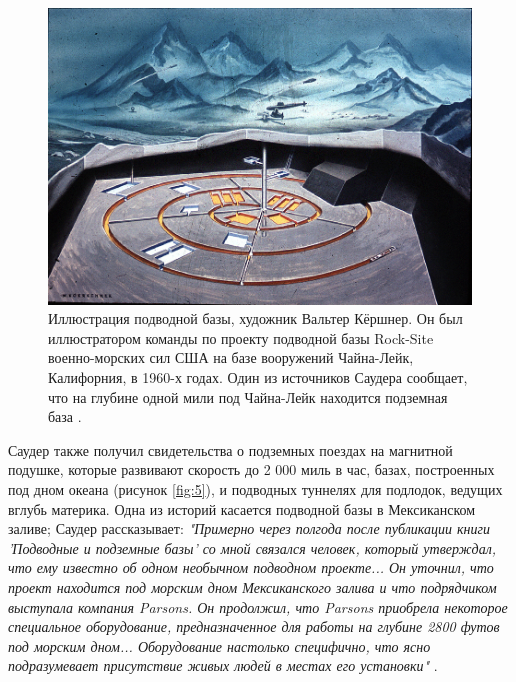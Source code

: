 \documentclass[10pt,twocolumn,letterpaper]{article}
\begin{document}
\begin{figure}[t]
\begin{center}
   \includegraphics[width=1\linewidth]{undersea.jpg}
\end{center}
   \caption{Иллюстрация подводной базы, художник Вальтер Кёршнер. Он был иллюстратором команды по проекту подводной базы Rock-Site военно-морских сил США на базе вооружений Чайна-Лейк, Калифорния, в 1960-х годах. Один из источников Саудера сообщает, что на глубине одной мили под Чайна-Лейк находится подземная база \cite{22,23}.}
\label{fig:5}
\label{fig:onecol}
\end{figure}

Саудер также получил свидетельства о подземных поездах на магнитной подушке, которые развивают скорость до 2 000 миль в час, базах, построенных под дном океана (рисунок \ref{fig:5}), и подводных туннелях для подлодок, ведущих вглубь материка. Одна из историй касается подводной базы в Мексиканском заливе; Саудер рассказывает: \textit{"Примерно через полгода после публикации книги 'Подводные и подземные базы' со мной связался человек, который утверждал, что ему известно об одном необычном подводном проекте... Он уточнил, что проект находится под морским дном Мексиканского залива и что подрядчиком выступала компания Parsons. Он продолжил, что Parsons приобрела некоторое специальное оборудование, предназначенное для работы на глубине 2800 футов под морским дном... Оборудование настолько специфично, что ясно подразумевает присутствие живых людей в местах его установки"} \cite{22}.
\end{document}
